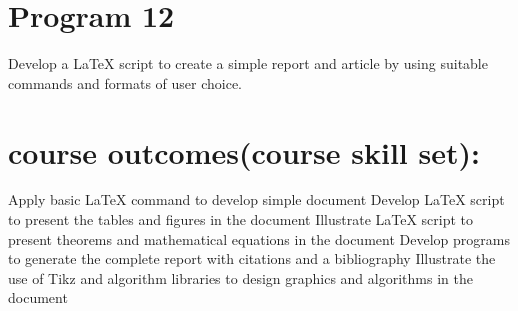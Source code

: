 \documentclass{article}
\begin{document}
\section{Program 12}
Develop a LaTeX script to create a simple report and article by using suitable commands and formats of
user choice.
\section{course outcomes(course skill set):}
Apply basic LaTeX command to develop simple document
Develop LaTeX script to present the tables and figures in the document
Illustrate LaTeX script to present theorems and mathematical equations in the document
Develop programs to generate the complete report with citations and a bibliography
Illustrate the use of Tikz and algorithm libraries to design graphics and algorithms in the
document\\
\end{document}
